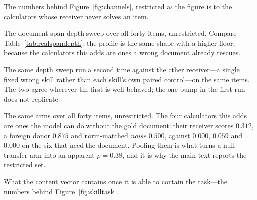 \documentclass{article}
\begin{document}
\begin{table}[h]
\caption{The numbers behind Figure~\ref{fig:channels}, restricted as the figure
is to the calculators whose receiver never solves an item.}
\label{tab:battery}
\centering
\small

\end{table}

\begin{table}[h]
\caption{The document-span depth sweep over all forty items, unrestricted.
Compare Table~\ref{tab:realspandepth}: the profile is the same shape with a
higher floor, because the calculators this adds are ones a wrong document
already rescues.}
\label{tab:realspan-all}
\centering
\small

\end{table}

\begin{table}[t]
\caption{The same depth sweep run a second time against the other receiver---a
single fixed wrong skill rather than each skill's own paired control---on the
same items. The two agree wherever the first is well behaved; the one bump in
the first run does not replicate.}
\label{tab:realspanfixed}
\centering
\small

\end{table}

\begin{table}[h]
\caption{The same arms over all forty items, unrestricted. The four calculators
this adds are ones the model can do without the gold document: their receiver
scores $0.312$, a foreign donor $0.875$ and norm-matched \emph{noise} $0.500$,
against $0.000$, $0.059$ and $0.000$ on the six that need the document. Pooling
them is what turns a null transfer arm into an apparent $\rho=0.38$, and it is
why the main text reports the restricted set.}
\label{tab:battery-all}
\centering
\small

\end{table}

\begin{table}[h]
\caption{What the content vector contains once it is able to contain the
task---the numbers behind Figure~\ref{fig:skilltask}.}
\label{tab:skilltask}
\centering
\small

\end{table}


\label{app:tables}
\end{document}
